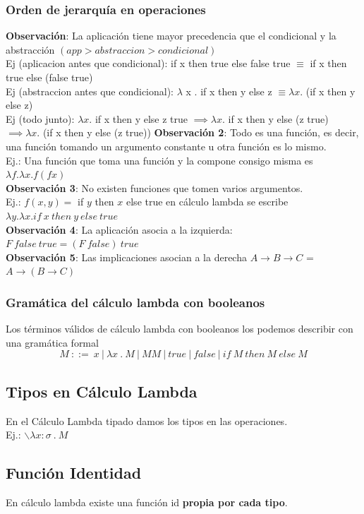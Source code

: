 \documentclass[10pt,a4paper]{article}
\begin{document}
\subsubsection*{Orden de jerarquía en operaciones}
\textbf{Observación}: La aplicación tiene mayor precedencia que el condicional y la abstracción $(app > abstraccion > condicional)$ \\
Ej (aplicacion antes que condicional): if x then true else false true $\equiv$ if x then true else (false true) \\
Ej (abstraccion antes que condicional): $\lambda$ x . if x then y else z $\equiv \lambda x .$ (if x then y else z) \\
Ej (todo junto): $\lambda x . $ if x then y else z true $\implies \lambda x .$ if x then y else (z true) $\implies \lambda x .$ (if x then y else (z true))
\textbf{Observación 2}: Todo es una función, es decir, una función tomando un argumento constante u otra función es lo mismo. \\
Ej.: Una función que toma una función y la compone consigo misma es $\lambda f . \lambda x . f(fx)$ \\
\textbf{Observación 3}: No existen funciones que tomen varios argumentos. \\ 
Ej.: $f(x,y) = $ if $y$ then $x$ else true en cálculo lambda se escribe $\lambda y . \lambda x . if \ x \ then \ y \ else \ true$ \\
\textbf{Observación 4}: La aplicación asocia a la izquierda: $F \ false \ true = (F \ false) \ true$ \\
\textbf{Observación 5}: Las implicaciones asocian a la derecha $A \rightarrow B \rightarrow C$ = $A \rightarrow (B \rightarrow C)$
\subsubsection*{Gramática del cálculo lambda con booleanos}
Los términos válidos de cálculo lambda con booleanos los podemos describir con una gramática formal 
\[M \ ::= \ x \ |\  \lambda x \ . \ M \ | \ MM \ | \ true \ | \ false \ | \ if \ M \ then \ M \ else \ M\] 
\subsection{Tipos en Cálculo Lambda}
En el Cálculo Lambda tipado damos los tipos en las operaciones. \\
Ej.: $\backslash \lambda x:\sigma \ . \ M$
\subsection*{Función Identidad}
En cálculo lambda existe una función id \textbf{propia por cada tipo}.
\end{document}
